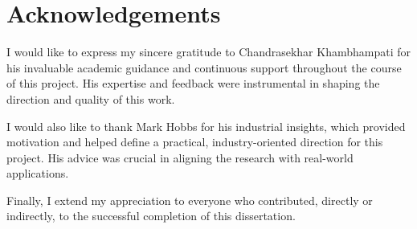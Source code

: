 \documentclass{article}
\begin{document}

\newpage{}
\section*{Acknowledgements}
I would like to express my sincere gratitude to Chandrasekhar Khambhampati for his invaluable academic guidance and continuous support throughout the course of this project. His expertise and feedback were instrumental in shaping the direction and quality of this work.  

I would also like to thank Mark Hobbs for his industrial insights, which provided motivation and helped define a practical, industry-oriented direction for this project. His advice was crucial in aligning the research with real-world applications.  

Finally, I extend my appreciation to everyone who contributed, directly or indirectly, to the successful completion of this dissertation.

\newpage{}
\end{document}
